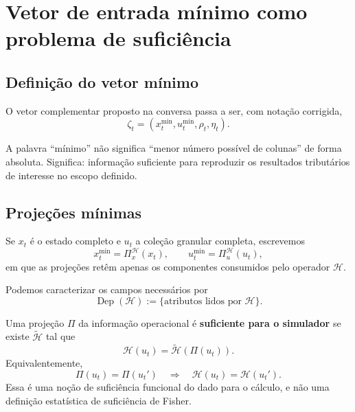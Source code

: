 \documentclass[11pt,a4paper]{article}
\newcommand{\cH}{\mathcal{H}}
\newcommand{\Dep}{\operatorname{Dep}}
\begin{document}
\section{Vetor de entrada mínimo como problema de suficiência}

\subsection{Definição do vetor mínimo}

O vetor complementar proposto na conversa passa a ser, com notação corrigida,
\begin{equation}
\boxed{
\zeta_t=
\left(
 x_t^{\min},
 u_t^{\min},
 \rho_t,
 \eta_t
\right).
}
\end{equation}

A palavra ``mínimo'' não significa ``menor número possível de colunas'' de forma absoluta. Significa: informação suficiente para reproduzir os resultados tributários de interesse no escopo definido.

\subsection{Projeções mínimas}

Se $x_t$ é o estado completo e $u_t$ a coleção granular completa, escrevemos
\begin{equation}
\boxed{
 x_t^{\min}=\Pi_x^{\mathcal H}(x_t),
 \qquad
 u_t^{\min}=\Pi_u^{\mathcal H}(u_t),
}
\label{eq:min-projections}
\end{equation}
em que as projeções retêm apenas os componentes consumidos pelo operador $\cH$.

Podemos caracterizar os campos necessários por
\begin{equation}
\Dep(\cH):=\{\text{atributos lidos por }\cH\}.
\end{equation}

\begin{formalizacao}
Uma projeção $\Pi$ da informação operacional é \textbf{suficiente para o simulador} se existe $\widetilde{\cH}$ tal que
\[
\cH(u_t)=\widetilde{\cH}(\Pi(u_t)).
\]
Equivalentemente,
\[
\Pi(u_t)=\Pi(u_t')
\quad\Longrightarrow\quad
\cH(u_t)=\cH(u_t').
\]
Essa é uma noção de suficiência funcional do dado para o cálculo, e não uma definição estatística de suficiência de Fisher.
\end{formalizacao}
\end{document}
